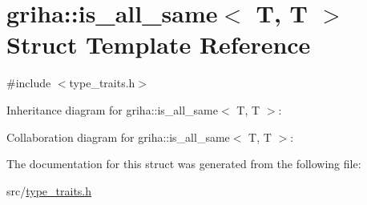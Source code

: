 \hypertarget{structgriha_1_1is__all__same_3_01_t_00_01_t_01_4}{}\section{griha\+:\+:is\+\_\+all\+\_\+same$<$ T, T $>$ Struct Template Reference}
\label{structgriha_1_1is__all__same_3_01_t_00_01_t_01_4}


{\ttfamily \#include $<$type\+\_\+traits.\+h$>$}



Inheritance diagram for griha\+:\+:is\+\_\+all\+\_\+same$<$ T, T $>$\+:


Collaboration diagram for griha\+:\+:is\+\_\+all\+\_\+same$<$ T, T $>$\+:


The documentation for this struct was generated from the following file\+:\begin{DoxyCompactItemize}
\item 
src/\hyperlink{type__traits_8h}{type\+\_\+traits.\+h}\end{DoxyCompactItemize}

